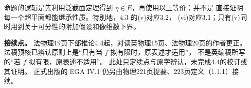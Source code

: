 \documentclass[openany,fontset=fandol]{ctexbook}
\begin{document}
命题的逻辑是先利用泛截面定理得到 $\eta\in E$，再使用以上等价；并不是
直接证明每一个超平面都能继承性质。特别地，4.3 的(v)对应3.2，
(vi)对应3.1；只有(v)同时用到关于可分性的附加假设和像维数下界。

\medskip
\noindent\textbf{接续点。}
法物理19页下部推论4.4起，对读英物理15页、法物理20页的作者更正。
法稿预核已辨认原则上是“只有当 $f$ 拟有限时，原表述才适用”，
不是英编稿所写的“若 $f$ 拟有限，原表述不适用”。
此处只定续点与原字辨认，未完成4.4的校订或其证明。
正式出版的 EGA IV.1 仍另由物理221页提要、223页定义（1.1.1）接续。
\end{document}
